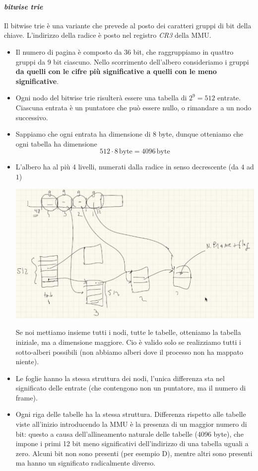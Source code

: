 \documentclass[11pt]{report}
\theoremstyle{definition}
\begin{document}
\paragraph{\emph{bitwise trie}} Il bitwise trie è una variante che prevede al posto dei caratteri gruppi di bit della chiave. L'indirizzo della radice è posto nel registro \emph{CR3} della MMU.
\begin{itemize}
	\item Il numero di pagina è composto da 36 bit, che raggruppiamo in quattro gruppi da 9 bit ciascuno. Nello scorrimento dell'albero consideriamo i gruppi \textbf{da quelli con le cifre più significative a quelli con le meno significative}.
	\item Ogni nodo del bitwise trie risulterà essere una tabella di $2^9=512$ entrate. Ciascuna entrata è un puntatore che può essere nullo, o rimandare a un nodo successivo.
	\item Sappiamo che ogni entrata ha dimensione di 8 byte, dunque otteniamo che ogni tabella ha dimensione
	\[512 \cdot 8\,\text{byte}=4096\,\text{byte}\]
	\item L'albero ha al più 4 livelli, numerati dalla radice in senso decrescente (da $4$ ad $1$)
	\begin{center}
		\includegraphics[scale=.55]{img/216.PNG}
	\end{center}
	Se noi mettiamo insieme tutti i nodi, tutte le tabelle, otteniamo la tabella iniziale, ma a dimensione maggiore. Cio è valido solo se realizziamo tutti i sotto-alberi possibili (non abbiamo alberi dove il processo non ha mappato niente). 
	\item Le foglie hanno la stessa struttura dei nodi, l'unica differenza sta nel significato delle entrate (che contengono non un puntatore, ma il numero di frame). 
	\item Ogni riga delle tabelle ha la stessa struttura. Differenza rispetto alle tabelle viste all'inizio introducendo la MMU è la presenza di un maggior numero di bit: questo a causa dell'allineamento naturale delle tabelle (4096 byte), che impone i primi 12 bit meno significativi dell'indirizzo di una tabella uguali a zero. Alcuni bit non sono presenti (per esempio D), mentre altri sono presenti ma hanno un significato radicalmente diverso.

\end{itemize}
\end{document}
